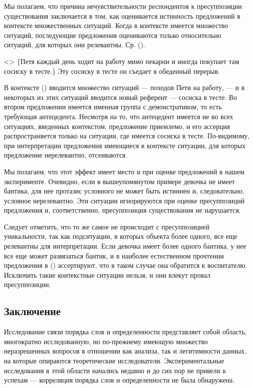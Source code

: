 \documentclass[a4paper, 12pt]{article}
\begin{document}
Мы полагаем, что причина нечувствительности респондентов к пресуппозиции существования заключается в том, как оценивается истинность предложений в контексте множественных ситуаций. Когда в контексте имеется множество ситуаций, последующие предложения оцениваются только относительно ситуаций, для которых они релевантны. Ср. (\nextx).

\ex<>
    \{Петя каждый день ходит на работу мимо пекарни и иногда покупает там сосиску в тесте.\} Эту сосиску в тесте он съедает в обеденный перерыв.
\xe

В контексте (\lastx) вводится множество ситуаций — походов Пети на работу, — и в некоторых из этих ситуаций вводится новый референт — сосиска в тесте. Во втором предложении имеется именная группа с демонстративом, то есть требующая антецедента. Несмотря на то, что антецедент имеется не во всех ситуациях, введенных контекстом, предложение приемлемо, и его ассерция распространяется только на ситуации, где имеется сосиска в тесте. По-видимому, при интерпретации предложения имеющиеся в контексте ситуации, для которых предложение нерелевантно, отсеиваются.

Мы полагаем, что этот эффект имеет место и при оценке предложений в нашем эксперименте. Очевидно, если в вышеупомянутом примере девочка не имеет бантика, для нее протазис условного не может быть истиннен и, следовательно, условное нерелевантно. Эти ситуации игнорируются при оценке пресуппозиций предложения и, соответственно, пресуппозиция существования не нарушается.

Следует отметить, что то же самое не происходит с пресуппозицией уникальности, так как подситуации, в которых объекта более одного, все еще релевантны для интерпретации. Если девочка имеет более одного бантика, у нее все еще может развязаться бантик, и в наиболее естественном прочтении предложения в () ассертируют, что в таком случае она обратится к воспитателю. Исключить такие контекстные ситуации нельзя, и они влекут провал пресуппозиции.

\subsection{Заключение}

Исследование связи порядка слов и определенности представляет собой область, многократно исследованную, но по-прежнему имеющую множество неразрешенных вопросов в отношении как анализа, так и легитимности данных, на которые опираются теоретические исследователи. Экспериментальные исследования в этой области начались недавно и до сих пор не привели к успехам — корреляция порядка слов и определенности не была обнаружена.
\end{document}
